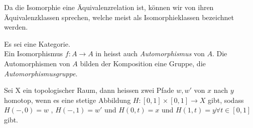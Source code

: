 \documentclass{article}
\begin{document}
		 \begin{defi}[Isomorphieklassen]
		  \cite[Definition 2.3.10]{Bra}
		 Da die Isomorphie eine \"Aquivalenzrelation ist, k\"onnen wir von ihren \"Aquivalenzklassen sprechen, welche meist als Isomorphieklassen bezeichnet werden.
		 \end{defi}
		 
		 
		\begin{defi}[Automorphismengruppen]
		\cite[Definition 2.3.13]{Bra}
		 Es sei \CatC eine Kategorie.  \\
		 Ein Isomorphismus \( f:A \to A \) in \CatC heisst auch \emph{Automorphismus} von $A$. 
		 Die Automorphismen von $A$ bilden \bzgl der Komposition eine Gruppe, die \emph{Automorphismusgruppe}.
		\end{defi}
		
		 \begin{defi}[Homotopieklasse]
		  \cite[Aufgabe 2.24]{Bra}
		 Sei X ein topologischer Raum, dann heissen zwei Pfade \( w,w'  \) von \(x \) nach \( y \) homotop, wenn es eine stetige Abbildung \( H : [0,1] \times [0,1 ] \to X \) gibt, sodass \( H(-,0) = w \) , \( H( -,1) =w' \) und \( H(0,t) =x \) und \(H(1,t) = y \forall t \in [0,1] \) gibt.
		 \end{defi}
		 
\end{document}
